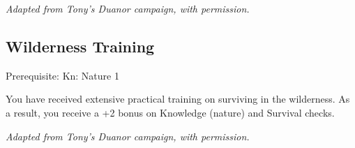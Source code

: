 \textit{Adapted from Tony's Duanor campaign, with permission.}
%

%
\subsection{Wilderness Training}

Prerequisite: Kn: Nature 1

You have received extensive practical training on surviving in the
wilderness. As a result, you receive a +2 bonus on Knowledge (nature) and
Survival checks.

\textit{Adapted from Tony's Duanor campaign, with permission.}
%


%
